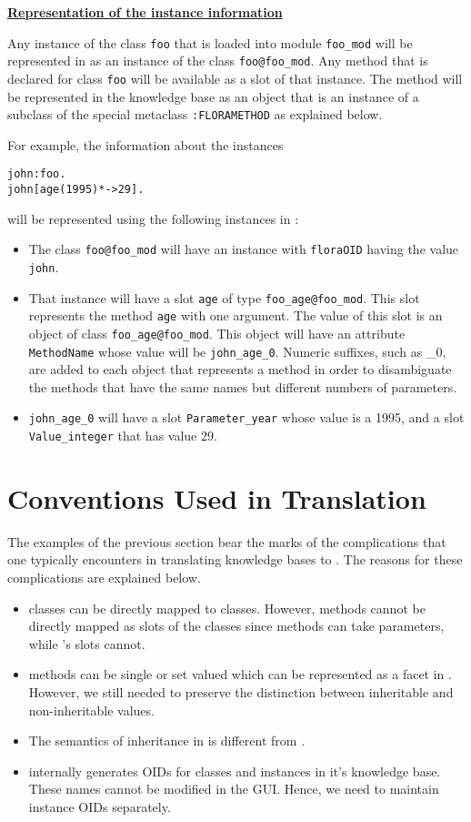 \underline{{\bf Representation of the instance information}}

 Any instance of the \FLORA class {\tt foo} that is loaded into module
{\tt foo\_mod} will be represented in \Protege as an instance of
the class {\tt foo@foo\_mod}. Any method that is
declared for class {\tt foo}  will be
available as a slot of that instance. The method
will be represented in the \Protege knowledge base as an object that is
an instance of a subclass of
the special metaclass {\tt :FLORAMETHOD} as explained below.

For example, the information about the instances
\begin{verbatim}
john:foo.
john[age(1995)*->29].
\end{verbatim}

will be represented using the following instances in \Protege:

\begin{itemize}
\item The \Protege class {\tt foo@foo\_mod} will have an instance with
{\tt floraOID}  having the value {\tt john}.
\item That instance
  will have a slot {\tt age}  of type {\tt foo\_age@foo\_mod}.
  This slot represents the \FLORA method {\tt age} with one argument.
  The value of this slot is an object of
  class {\tt foo\_age@foo\_mod}. This object will have an attribute
  {\tt MethodName} whose value will be {\tt john\_age\_0}.
  Numeric suffixes, such as \_0, are added to each object that represents
  a method in order to disambiguate the methods that have the
  same names but different numbers of parameters.
\item {\tt john\_age\_0} will have a slot {\tt Parameter\_year} whose value is a
  1995, and a slot {\tt Value\_integer} that has value 29.
\end{itemize}

\section{Conventions Used in Translation}
The examples of the previous section bear the marks of the complications
that one typically encounters in translating \FLORA
\FLORA knowledge bases to \Protege.
The reasons for these complications are explained below.

\begin{itemize}
\item \fl classes can be directly mapped to \Protege classes. However,
  \fl
methods cannot be directly mapped as slots of the
\Protege classes since \fl methods can take parameters, while \Protege's
  slots cannot.
\item \fl methods can be single or set valued which can be represented
as a facet in \NoProtege. However, we still needed to preserve the
distinction between inheritable and non-inheritable values.
\item The semantics of inheritance in \Protege is different from \fl.
\item \Protege internally generates OIDs for classes and instances
in it's knowledge base. These names cannot be modified in the GUI.
Hence, we need to maintain \fl instance OIDs separately.
\end{itemize}

